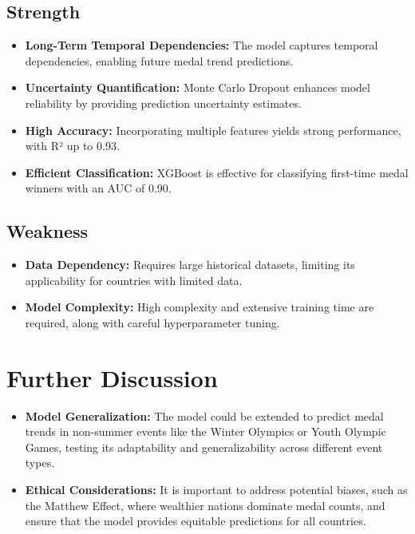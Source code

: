 \documentclass{mcmthesis}
\begin{document}
\subsection{Strength}
\begin{itemize}[leftmargin=0.15in, labelsep=0.1in, itemsep=10pt, parsep=5pt]
	\item \textbf{Long-Term Temporal Dependencies:} The model captures temporal dependencies, enabling future medal trend predictions.
	\item \textbf{Uncertainty Quantification:} Monte Carlo Dropout enhances model reliability by providing prediction uncertainty estimates.
	\item \textbf{High Accuracy:} Incorporating multiple features yields strong performance, with R² up to 0.93.
	\item \textbf{Efficient Classification:} XGBoost is effective for classifying first-time medal winners with an AUC of 0.90.
\end{itemize}

\subsection{Weakness}
\begin{itemize}[leftmargin=0.15in, labelsep=0.1in, itemsep=10pt, parsep=5pt]
	\item \textbf{Data Dependency:} Requires large historical datasets, limiting its applicability for countries with limited data.
	\item \textbf{Model Complexity:} High complexity and extensive training time are required, along with careful hyperparameter tuning.
\end{itemize}

	
\section{Further Discussion}

\begin{itemize}[leftmargin=0.15in, labelsep=0.1in, itemsep=10pt, parsep=5pt]
	\item \textbf{Model Generalization:} The model could be extended to predict medal trends in non-summer events like the Winter Olympics or Youth Olympic Games, testing its adaptability and generalizability across different event types.
	\item \textbf{Ethical Considerations:} It is important to address potential biases, such as the Matthew Effect, where wealthier nations dominate medal counts, and ensure that the model provides equitable predictions for all countries.
\end{itemize}
\end{document}
